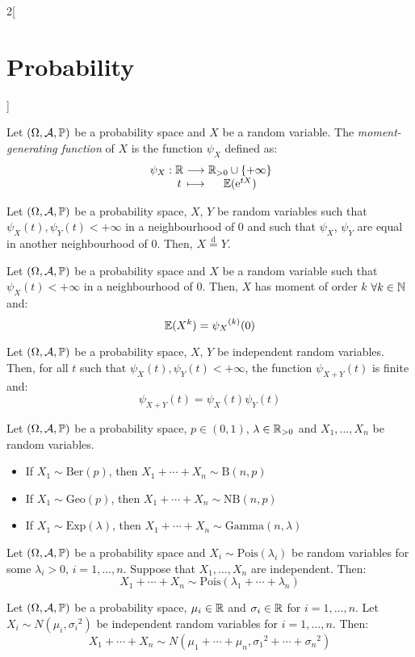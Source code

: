 \documentclass[../../../main.tex]{subfiles}
\begin{document}
\begin{multicols}{2}[\section{Probability}]
\begin{corollary}
  \end{corollary}
  \begin{definition}
    Let $(\Omega,\mathcal{A},\mathbb{P})$ be a probability space and $X$ be a random variable. The \emph{moment-generating function} of $X$ is the function $\psi_X$ defined as:
    $$\function{\psi_X}{\RR}{\RR_{>0}\cup\{+\infty\}}{t}{\Exp(\exp{tX})}$$
  \end{definition}
  \begin{theorem}
    Let $(\Omega,\mathcal{A},\mathbb{P})$ be a probability space, $X$, $Y$ be random variables such that $\psi_X(t),\psi_Y(t)<+\infty$ in a neighbourhood of 0 and such that $\psi_X$, $\psi_Y$ are equal in another neighbourhood of 0. Then, $X\overset{\text{d}}{=}Y$.
  \end{theorem}
  \begin{theorem}
    Let $(\Omega,\mathcal{A},\mathbb{P})$ be a probability space and $X$ be a random variable such that $\psi_X(t)<+\infty$ in a neighbourhood of 0. Then, $X$ has moment of order $k$ $\forall k\in\mathbb{N}$ and: $$\mathbb{E}(X^k)={\psi_X}^{(k)}(0)$$
  \end{theorem}
  \begin{theorem}
    Let $(\Omega,\mathcal{A},\mathbb{P})$ be a probability space, $X$, $Y$ be independent random variables. Then, for all $t$ such that $\psi_X(t),\psi_Y(t)<+\infty$, the function $\psi_{X+Y}(t)$ is finite and: $$\psi_{X+Y}(t)=\psi_X(t)\psi_Y(t)$$
  \end{theorem}
  \begin{proposition}
    Let $(\Omega,\mathcal{A},\mathbb{P})$ be a probability space, $p\in(0,1)$, $\lambda\in\mathbb{R}_{>0}$ and $X_1,\ldots,X_n$ be \iid random variables.
    \begin{itemize}
      \item If $X_1\sim\text{Ber}(p)$, then $X_1+\cdots+X_n\sim\text{B}(n,p)$
      \item If $X_1\sim\text{Geo}(p)$, then $X_1+\cdots+X_n\sim\text{NB}(n,p)$
      \item If $X_1\sim\text{Exp}(\lambda)$, then $X_1+\cdots+X_n\sim\text{Gamma}(n,\lambda)$
    \end{itemize}
  \end{proposition}
  \begin{proposition}
    Let $(\Omega,\mathcal{A},\mathbb{P})$ be a probability space and $X_i\sim\text{Pois}(\lambda_i)$ be random variables for some $\lambda_i>0$, $i=1,\ldots,n$. Suppose that $X_1,\ldots,X_n$ are independent. Then:
    $$X_1+\cdots+X_n\sim\text{Pois}(\lambda_1+\cdots+\lambda_n)$$
  \end{proposition}
  \begin{proposition}
    Let $(\Omega,\mathcal{A},\mathbb{P})$ be a probability space, $\mu_i\in\mathbb{R}$ and $\sigma_i\in\mathbb{R}$ for $i=1,\ldots,n$. Let $X_i\sim N(\mu_i,{\sigma_i}^2)$ be independent random variables for $i=1,\ldots,n$. Then: $$X_1+\cdots+X_n\sim N(\mu_1+\cdots+\mu_n,{\sigma_1}^2+\cdots+{\sigma_n}^2)$$
  \end{proposition}

\end{multicols}
\end{document}
